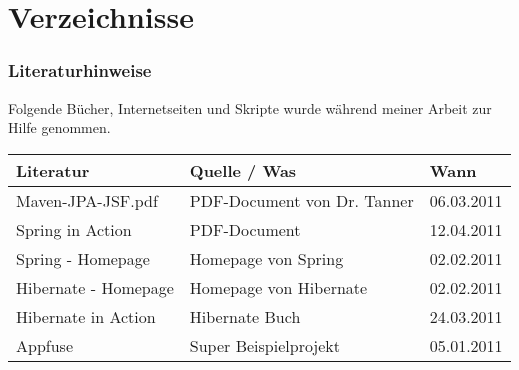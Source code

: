 \part{Verzeichnisse}
\newpage
\section{Literaturhinweise}
%
Folgende Bücher, Internetseiten und Skripte wurde während meiner Arbeit zur Hilfe genommen.\\
\begin{tabular}{p{5cm}p{6cm}p{2cm}}
  \toprule
  \textbf{Literatur} & \textbf{Quelle / Was} &  \textbf{Wann}\\
  \midrule
  Maven-JPA-JSF.pdf & PDF-Document von Dr. Tanner & 06.03.2011\\
%
  Spring in Action & PDF-Document & 12.04.2011\\
%
  Spring - Homepage & Homepage von Spring & 02.02.2011\\
%
  Hibernate - Homepage & Homepage von Hibernate & 02.02.2011\\
%
  Hibernate in Action & Hibernate Buch & 24.03.2011\\
%
  Appfuse & Super Beispielprojekt & 05.01.2011\\
  \bottomrule
\end{tabular}
%
\listoffigures
%
\listoftables



